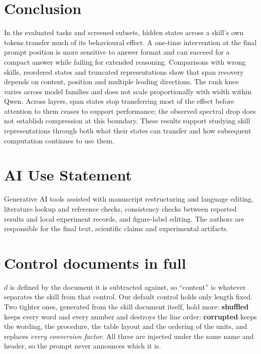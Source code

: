 \documentclass{article}
\newcommand{\dvec}{\ensuremath{d}}
\begin{document}
\section{Conclusion}

In the evaluated tasks and screened subsets, hidden states across a skill's
own tokens transfer much of its behavioural effect. A one-time intervention at
the final prompt position is more sensitive to answer format and can succeed
for a compact answer while failing for extended reasoning. Comparisons with
wrong skills, reordered states and truncated representations show that span
recovery depends on content, position and multiple leading directions. The
rank knee varies across model families and does not scale proportionally with
width within Qwen. Across layers, span states stop transferring most of the
effect before attention to them ceases to support performance; the observed
spectral drop does not establish compression at this boundary. These results
support studying skill representations through both what their states can
transfer and how subsequent computation continues to use them.

\label{endmain}
\clearpage
\section*{AI Use Statement}
Generative AI tools assisted with manuscript restructuring and language editing,
literature lookup and reference checks, consistency checks between reported
results and local experiment records, and figure-label editing. The authors
are responsible for the final text, scientific claims and experimental artifacts.




\clearpage
\appendix

\section{Control documents in full}
\label{app:controls}

$\dvec$ is defined by the document it is subtracted against, so ``content'' is
whatever separates the skill from that control. Our default control holds only
length fixed. Two tighter ones, generated from the skill document itself, hold
more: \textbf{shuffled} keeps every word and every number and destroys the line
order; \textbf{corrupted} keeps the wording, the procedure, the table layout and
the ordering of the units, and replaces \emph{every conversion factor}. All
three are injected under the same name and header, so the prompt never announces
which it is.
\end{document}
